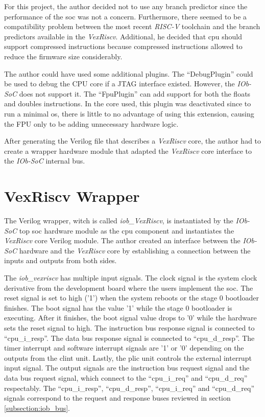 For this project, the author decided not to use any branch predictor since the performance of the \acrshort{soc} was not a concern. Furthermore, there seemed to be a compatibility problem between the most recent \textit{RISC-V} toolchain and the branch predictors available in the \textit{VexRiscv}. Additional, he decided that \acrshort{cpu} should support compressed instructions because compressed instructions allowed to reduce the firmware size considerably. 

The author could have used some additional plugins. The \enquote{DebugPlugin} could be used to debug the CPU core if a JTAG interface existed. However, the \textit{IOb-SoC} does not support it. The \enquote{FpuPlugin} can add support for both the floats and doubles instructions. In the core used, this plugin was deactivated since to run a minimal \acrshort{os}, there is little to no advantage of using this extension, causing the FPU only to be adding unnecessary hardware logic.

After generating the Verilog file that describes a \textit{VexRiscv} core, the author had to create a wrapper hardware module that adapted the \textit{VexRiscv} core interface to the \textit{IOb-SoC} internal bus.

\section{VexRiscv Wrapper}
The Verilog wrapper, witch is called \textit{iob\_VexRiscv}, is instantiated by the \textit{IOb-SoC} top \acrshort{soc} hardware module as the \acrshort{cpu} component and instantiates the \textit{VexRiscv} core Verilog module. The author created an interface between the \textit{IOb-SoC} hardware and the \textit{VexRiscv} core by establishing a connection between the inputs and outputs from both sides.

The \textit{iob\_vexriscv} has multiple input signals. The clock signal is the system clock derivative from the development board where the users implement the \acrshort{soc}. The reset signal is set to high ('1') when the system reboots or the stage 0 bootloader finishes. The boot signal has the value '1' while the stage 0 bootloader is executing. After it finishes, the boot signal value drops to '0' while the hardware sets the reset signal to high. The instruction bus response signal is connected to \enquote{cpu\_i\_resp}. The data bus response signal is connected to \enquote{cpu\_d\_resp}. The timer interrupt and software interrupt signals are '1' or '0' depending on the outputs from the \acrshort{clint} unit. Lastly, the \acrshort{plic} unit controls the external interrupt input signal. The output signals are the instruction bus request signal and the data bus request signal, which connect to the \enquote{cpu\_i\_req} and \enquote{cpu\_d\_req} respectably. The \enquote{cpu\_i\_resp}, \enquote{cpu\_d\_resp}, \enquote{cpu\_i\_req} and \enquote{cpu\_d\_req} signals correspond to the request and response buses reviewed in section \ref{subsection:iob_bus}.

